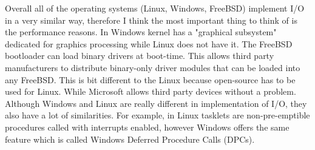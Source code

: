 \documentclass[letterpaper,10pt,draftclsnofoot,onecolumn]{IEEEtran}
\begin{document}
Overall all of the operating systems (Linux, Windows, FreeBSD) implement I/O in a very similar way, therefore I think the most important thing to think of is the performance reasons. In Windows kernel has a "graphical subsystem" dedicated for graphics processing while Linux does not have it. The FreeBSD bootloader can load binary drivers at boot-time. This allows third party manufacturers to distribute binary-only driver modules that can be loaded into any FreeBSD. This is bit different to the Linux because open-source has to be used for Linux. While Microsoft allows third party devices without a problem. Although Windows and Linux are really different in implementation of I/O, they also have a lot of similarities. For example, in Linux tasklets are non-pre-emptible procedures called with interrupts enabled, however Windows offers the same feature which is called Windows Deferred Procedure Calls (DPCs).



\end{document}
